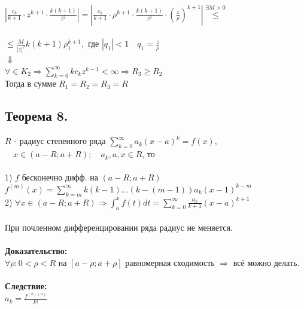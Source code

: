 \documentclass[a4paper,12pt]{article} %
\begin{document}
    \ \\
    $|\frac{c_k}{k + 1} \cdot z^{k + 1} \cdot \frac{k(k+1)}{z^2}| = | \frac{c_k}{k + 1} \cdot \rho^{k + 1} \cdot \frac{k(k + 1)}{z^2} \cdot \left( \frac{z}{\rho} \right)^{k + 1}| \stackrel{\exists M > 0}{\leqslant} $\\
    \ \\
    $\leqslant \frac{M}{|z|^2} k(k+1) \rho_1^{k + 1}, \text{ где } |q_1| < 1 \quad q_1 = \frac{z}{\rho}$    \\
    \hspace*{3 cm} $\Downarrow$\\
    $\forall \in K_2 \Rightarrow \sum\limits_{k = 0}^\infty k c_k z^{k - 1} < \infty \Rightarrow R_3 \geqslant R_2$\\
    Тогда в сумме $R_1 = R_2 = R_3 = R$\\
      \subsection*{Теорема 8.}
       $R$ - радиус степенного ряда $\sum\limits_{k = 0}^\infty a_k (x - a)^k = f(x), $\\
      $
      \quad x \in (a - R; a + R); \quad a_k, a, x \in R$, то\\
      \ \\
      1) $f$  бесконечно дифф. на $(a - R; a + R)$ \\
      $f^{(m)}(x) = \sum\limits_{k = m}^\infty k(k-1) ... (k - (m - 1)) a_k (x - 1)^{k - m}$ \\
      
      2) $\forall x \in (a - R; a + R) \Rightarrow \int_{a}^{x} f(t) dt = \sum\limits_{k = 0}^\infty \frac{a_k}{k + 1} (x - a)^{k + 1}$ \\
      \ \\
      При почленном дифференцировании ряда радиус не меняется.\\
      \ \\
      \textbf{Доказательство:}\\
      $\forall \rho: 0 < \rho < R  \text{ на } [a - \rho; a + \rho ]$ равномерная сходимость $\Rightarrow$ всё можно делать.\\
      \ \\
      \textbf{Следствие:}\\
      $a_k = \frac{f^{(k)(a)}}{k!}
	  $      
  
 
\end{document}
